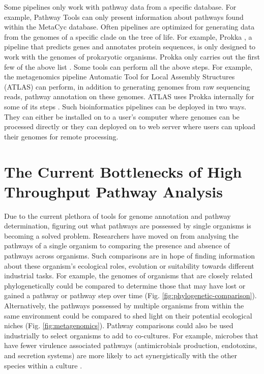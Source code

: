 Some pipelines only work with pathway data from a specific database. For example, Pathway Tools \cite{karp2002pathway} can only present information about pathways found within the MetaCyc \cite{karp2002metacyc} database. Often pipelines are optimized for generating data from the genomes of a specific clade on the tree of life. For example, Prokka \cite{seemann2014prokka}, a pipeline that predicts genes and annotates protein sequences, is only designed to work with the genomes of prokaryotic organisms. Prokka only carries out the first few of the above list \cite{seemann2014prokka}. Some tools can perform all the above steps. For example, the metagenomics pipeline Automatic Tool for Local Assembly Structures (ATLAS) \cite{white2017atlas,kieser2019atlas} can perform, in addition to generating genomes from raw sequencing reads, pathway annotation on these genomes. ATLAS uses Prokka internally for some of its steps \cite{white2017atlas,kieser2019atlas}. Such bioinformatics pipelines can be deployed in two ways. They can either be installed on to a user's computer where genomes can be processed directly or they can deployed on to web server where users can upload their genomes for remote processing.

\section{The Current Bottlenecks of High Throughput Pathway Analysis}

Due to the current plethora of tools for genome annotation and pathway determination, figuring out what pathways are possessed by single organisms is becoming a solved problem. Researchers have moved on from analysing the pathways of a single organism to comparing the presence and absence of pathways across organisms. Such comparisons are in hope of finding information about these organism's ecological roles, evolution or suitability towards different industrial tasks. For example, the genomes of organisms that are closely related phylogenetically could be compared to determine those that may have lost or gained a pathway or pathway step over time (Fig. \ref{fig:phylogenetic-comparison}). Alternatively, the pathways possessed by multiple organisms from within the same environment could be compared to shed light on their potential ecological niches (Fig. \ref{fig:metagenomics}). Pathway comparisons could also be used industrially to select organisms to add to co-cultures. For example, microbes that have fewer virulence associated pathways (antimicrobials production, endotoxins, and secretion systems) are more likely to act synergistically with the other species within a culture \cite{mamat2015detoxifying}.


